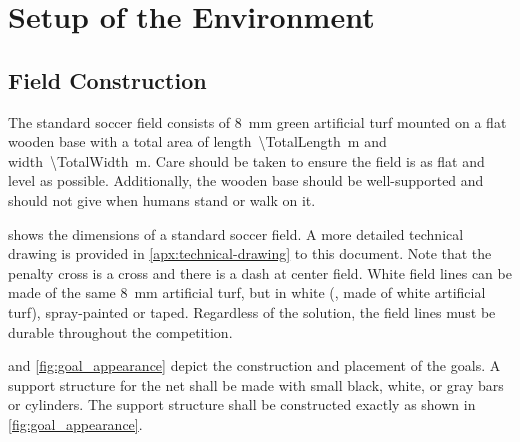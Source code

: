 \section{Setup of the Environment}
\label{sec:setup_environment}

\subsection{Field Construction}
\label{sec:field_dim}

The standard soccer field consists of \qty{8}{\milli\metre} green artificial turf mounted on a flat wooden base with a total area of length~\qty{\TotalLength}{\metre} and width~\qty{\TotalWidth}{\metre}. Care should be taken to ensure the field is as flat and level as possible. Additionally, the wooden base should be well-supported and should not give when humans stand or walk on it.


 shows the dimensions of a standard soccer field.
A more detailed technical drawing is provided in \cref{apx:technical-drawing} to this document.
Note that the penalty cross is a cross and there is a dash at center field. White field lines can be made of the same \qty{8}{\milli\metre} artificial turf, but in white (\ie, made of white artificial turf), spray-painted or taped. Regardless of the solution, the field lines must be durable throughout the competition.

 and \cref{fig:goal_appearance} depict the construction and placement of the goals. A support structure for the net shall be made with small black, white, or gray bars or cylinders.  The support structure shall be constructed exactly as shown in \cref{fig:goal_appearance}.

